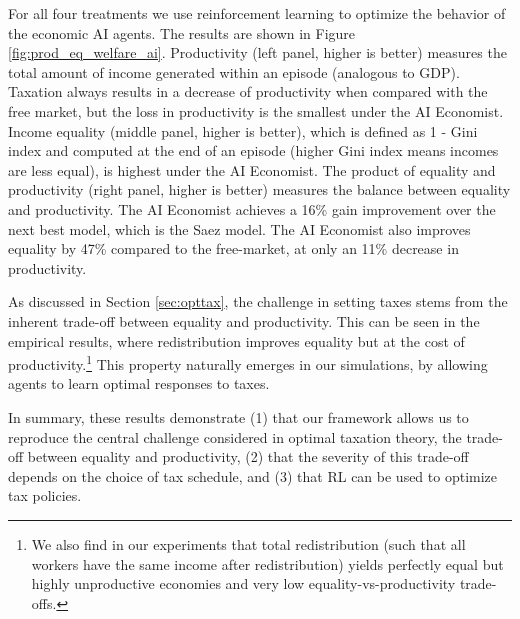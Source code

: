For all four treatments we use reinforcement learning to optimize the behavior of the economic AI agents. The results are shown in Figure \ref{fig:prod_eq_welfare_ai}. Productivity (left panel, higher is better) measures the total amount of income generated within an episode (analogous to GDP). Taxation always results in a decrease of productivity when compared with the free market, but the loss in productivity is the smallest under the AI Economist. Income equality (middle panel, higher is better), which is defined as 1 - Gini index and computed at the end of an episode (higher Gini index means incomes are less equal), is highest under the AI Economist.
The product of equality and productivity (right panel, higher is better) measures the balance between equality and productivity. The AI Economist achieves a 16\% gain improvement over the next best model, which is the Saez model. The AI Economist also improves equality by 47\% compared to the free-market, at only an 11\% decrease in productivity.

As discussed in Section \ref{sec:opttax}, the challenge in setting taxes stems from the inherent trade-off between equality and productivity.  This can be  seen in the empirical results, where
redistribution  improves equality but at the cost of productivity.\footnote{We also find in our experiments that total redistribution (such that all workers have the same income after redistribution) yields perfectly equal but highly unproductive economies and very low equality-vs-productivity trade-offs.}
This property naturally emerges  in our simulations, by allowing agents to learn optimal responses to  taxes.

In summary, these results demonstrate (1) that our framework allows us to reproduce the central challenge considered in optimal taxation theory, the trade-off between equality and productivity, (2) that the severity of this trade-off depends on the choice of tax schedule, and (3) that RL can be used to optimize tax policies.

